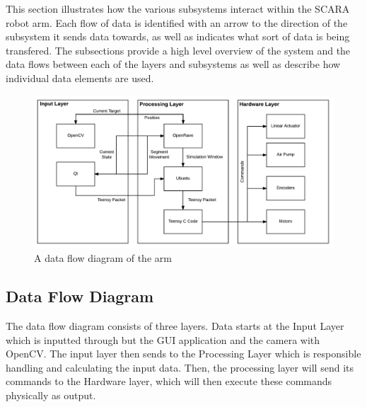 This section illustrates how the various subsystems interact within the SCARA robot arm. Each flow of data is
identified with an arrow to the direction of the subsystem it sends data towards, as well as indicates what sort of data is being transfered. The subsections provide a high level
overview of the system and the data flows between each of the layers and subsystems as well as
describe how individual data elements are used. 

\begin{figure}[h!]
	\centering
 	\includegraphics[width=\textwidth]{images/ADS_dataflow}
 \caption{A data flow diagram of the arm}
\end{figure}

\subsection{Data Flow Diagram}
The data flow diagram consists of three layers. Data starts at the Input Layer which is inputted through but the GUI application and the camera with OpenCV. The input layer then sends to the Processing
Layer which is responsible handling and calculating the input data. Then, the processing layer will send its commands to the Hardware layer, which will then execute these commands physically as output.